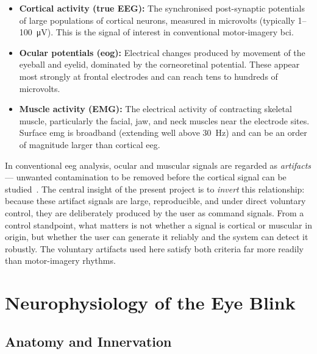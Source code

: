 \begin{itemize}[leftmargin=*]
    \item \textbf{Cortical activity (true EEG):} The synchronised
    post-synaptic potentials of large populations of cortical
    neurons, measured in microvolts (typically 1--\SI{100}{\micro\volt}).
    This is the signal of interest in conventional motor-imagery
    \acrshort{bci}.

    \item \textbf{Ocular potentials (\acrshort{eog}):} Electrical changes
    produced by movement of the eyeball and eyelid, dominated by the
    corneoretinal potential. These appear most strongly at frontal
    electrodes and can reach tens to hundreds of microvolts.

    \item \textbf{Muscle activity (EMG):} The electrical activity of
    contracting skeletal muscle, particularly the facial, jaw, and
    neck muscles near the electrode sites. Surface \acrshort{emg}
    is broadband (extending well above \SI{30}{\hertz}) and can be
    an order of magnitude larger than cortical \acrshort{eeg}.
\end{itemize}

In conventional \acrshort{eeg} analysis, ocular and muscular signals
are regarded as \emph{artifacts} --- unwanted contamination to be
removed before the cortical signal can be studied~\cite{croft2000removal,
fatourechi2007emg}. The central insight of the present project is to
\emph{invert} this relationship: because these artifact signals are
large, reproducible, and under direct voluntary control, they are
deliberately produced by the user as command signals. From a control
standpoint, what matters is not whether a signal is cortical or
muscular in origin, but whether the user can generate it reliably and
the system can detect it robustly. The voluntary artifacts used here
satisfy both criteria far more readily than motor-imagery rhythms.

\section{Neurophysiology of the Eye Blink}
\label{sec:med_blink}

\subsection{Anatomy and Innervation}

